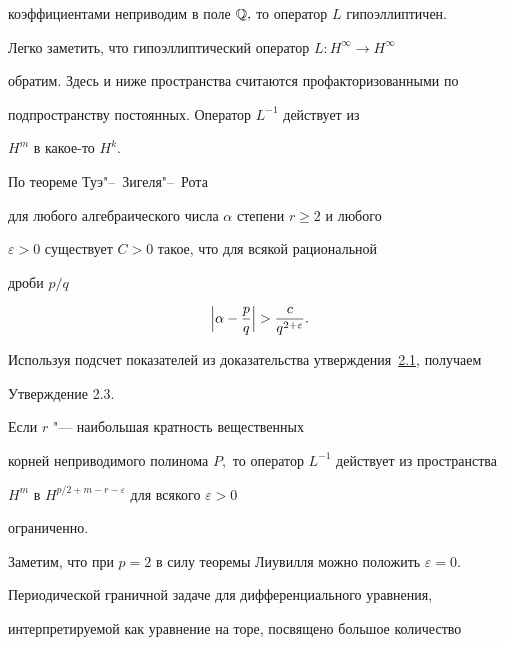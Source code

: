 коэффициентами неприводим в поле ${\Bbb Q},$ то оператор $L$  гипоэллиптичен\rm.



\smallskip



Легко заметить, что гипоэллиптический оператор $L : H^\infty \to H^\infty$

обратим. Здесь и ниже пространства считаются профакторизованными по

подпространству постоянных. Оператор $L^{-1}$ действует из

$H^m$ в какое-то $H^k$. 

По теореме Туэ"--~Зигеля"--~Рота~\cite{bur:13}

для любого алгебраического числа $\alpha$ степени $r \ge 2$ и любого

$\varepsilon > 0$ существует $C > 0$ такое, что для всякой рациональной

дроби $p/q$

$$

\Bigl|\alpha - \frac pq\Bigr| > \frac {c}{q^{2 + \varepsilon}}.

$$



\smallskip



Используя подсчет показателей из доказательства утверждения~\hyperlink{bur:utv2.1}{2.1}, получаем



\smallskip

{\small\sc Утверждение  2.3.}  \it 

Если $r$ "--- наибольшая кратность вещественных

корней неприводимого полинома $P,$ то оператор $ L^{-1}$ действует из пространства

$H^m$ в $H^{ p/2+m-r- \varepsilon}$ для всякого $\varepsilon>0$

ограниченно\rm.



\smallskip



Заметим, что при $p = 2$ в силу теоремы Лиувилля можно положить $\varepsilon = 0$.




Периодической граничной задаче для дифференциального уравнения,

интерпретируемой как уравнение на торе, посвящено большое количество

